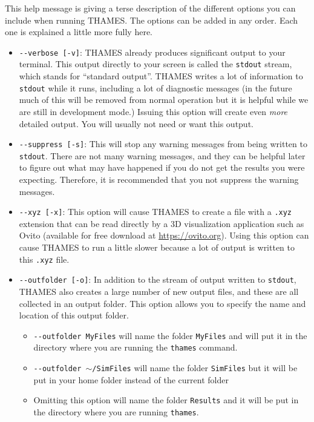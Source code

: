 \documentclass{article}
\begin{document}
This help message is giving a terse description of the different options you can
include when running THAMES. The options can be added in any order. Each one is
explained a little more fully here.
\begin{itemize}
	\item \verb|--verbose [-v]|: THAMES already produces significant output to your
	      terminal. This output directly to your screen is called the \verb|stdout|
	      stream, which stands for ``standard output''.
	      THAMES writes a lot of information to \verb|stdout| while it runs,
	      including a lot of diagnostic messages (in the future much of
	      this will be removed from normal operation but it is helpful while we
	      are still in development mode.) Issuing this option will create even
	      \textit{more} detailed output. You will usually not need or want this
	      output.
	\item \verb|--suppress [-s]|: This will stop any warning messages from being
	      written to \verb|stdout|. There are not many warning messages, and they can
	      be helpful later to figure out what may have happened if you do not get
	      the results you were expecting. Therefore, it is recommended that you
	      not suppress the warning messages.
	\item \verb|--xyz [-x]|: This option will cause THAMES to create a file with a
	      \verb|.xyz| extension that can be read directly by a 3D visualization
	      application such as Ovito (available for free download at \url{https://ovito.org}).
	      Using this option can cause THAMES to run a little slower because a lot
	      of output is written to this \verb|.xyz| file.
	\item \verb|--outfolder [-o]|: In addition to the stream of output written
	      to \verb|stdout|, THAMES also creates a large number of new output files,
	      and these are all collected in an output folder. This option allows
	      you to specify the name and location of this output folder.
	      \begin{itemize}
		      \item \verb|--outfolder MyFiles| will name the folder \verb|MyFiles| and
		            will put it in the directory where you are running the \verb|thames|
		            command.
		      \item \verb|--outfolder |$\sim$\verb|/SimFiles| will name the folder \verb|SimFiles| but
		            it will be put in your home folder instead of the current folder
		      \item Omitting this option will name the folder \verb|Results| and it will
		            be put in the directory where you are running \verb|thames|.
	      \end{itemize}
\end{itemize}
\end{document}

